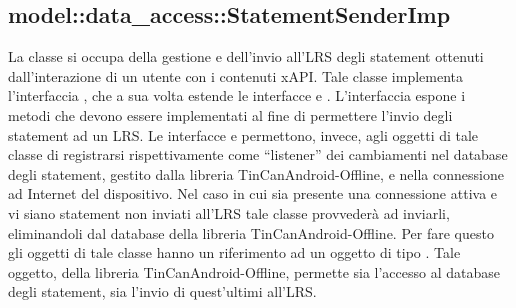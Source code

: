 \documentclass[../Tesi.tex]{subfiles}
\begin{document}
		\subsection{model::data\_access::StatementSenderImp}
		La classe  si occupa della gestione e dell'invio all'LRS degli statement ottenuti dall'interazione di un utente con i contenuti xAPI. Tale classe implementa l'interfaccia , che a sua volta estende le interfacce  e . L'interfaccia  espone i metodi che devono essere implementati al fine di permettere l'invio degli statement ad un LRS. Le interfacce  e  permettono, invece, agli oggetti di tale classe di registrarsi rispettivamente come ``listener'' dei cambiamenti nel database degli statement, gestito dalla libreria TinCanAndroid-Offline, e nella connessione ad Internet del dispositivo. Nel caso in cui sia presente una connessione attiva e vi siano statement non inviati all'LRS tale classe provvederà ad inviarli, eliminandoli dal database della libreria TinCanAndroid-Offline. Per fare questo gli oggetti di tale classe hanno un riferimento ad un oggetto di tipo . Tale oggetto, della libreria TinCanAndroid-Offline, permette sia l'accesso al database degli statement, sia l'invio di quest'ultimi all'LRS.
\end{document}
